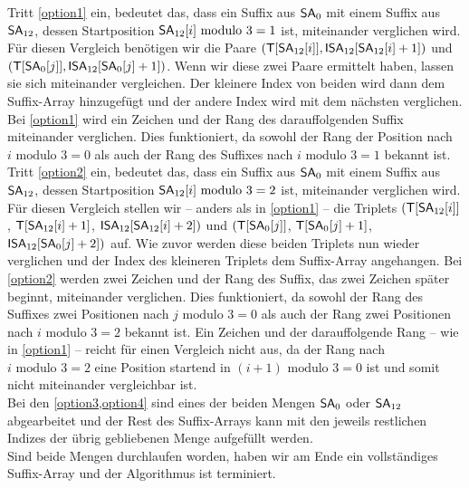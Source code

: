 Tritt \cref{option1} ein, bedeutet das, dass ein Suffix aus $\sa_{0}$ mit einem Suffix aus $\sa_{12}$, dessen Startposition $\sa_{12}[i] \text{ modulo } 3 = 1$ ist, miteinander verglichen wird. Für diesen Vergleich benötigen wir die Paare $(\inputtext[\sa_{12}[i]], \isa_{12}[\sa_{12}[i]+1])$ und $(\inputtext[\sa_{0}[j]], \isa_{12}[\sa_{0}[j]+1])$. Wenn wir diese zwei Paare ermittelt haben, lassen sie sich miteinander vergleichen. Der kleinere Index von beiden wird dann dem Suffix-Array \sa hinzugefügt und der andere Index wird mit dem nächsten verglichen. Bei \cref{option1} wird ein Zeichen und der Rang des darauffolgenden Suffix miteinander verglichen. Dies funktioniert, da sowohl der Rang der Position nach $i \text{ modulo } 3 = 0$ als auch der Rang des Suffixes nach $i \text{ modulo } 3 = 1$ bekannt ist. \\
Tritt \cref{option2} ein, bedeutet das, dass ein Suffix aus $\sa_{0}$ mit einem Suffix aus $\sa_{12}$, dessen Startposition $\sa_{12}[i] \text{ modulo } 3 = 2$ ist, miteinander verglichen wird. Für diesen Vergleich stellen wir -- anders als in \cref{option1} -- die Triplets $(\inputtext[\sa_{12}[i]]$, $\inputtext[\sa_{12}[i]+1]$, $\isa_{12}[\sa_{12}[i]+2])$ und $(\inputtext[\sa_{0}[j]]$, $\inputtext[\sa_{0}[j]+1]$, $\isa_{12}[\sa_{0}[j]+2])$ auf. Wie zuvor werden diese beiden Triplets nun wieder verglichen und der Index des kleineren Triplets dem Suffix-Array angehangen. Bei \cref{option2} werden zwei Zeichen und der Rang des Suffix, das zwei Zeichen später beginnt, miteinander verglichen. Dies funktioniert, da sowohl der Rang des Suffixes zwei Positionen nach $j \text{ modulo } 3 = 0$ als auch der Rang zwei Positionen nach $i \text{ modulo } 3 = 2$ bekannt ist. Ein Zeichen und der darauffolgende Rang -- wie in \cref{option1} -- reicht für einen Vergleich nicht aus, da der Rang nach $i \text{ modulo } 3 = 2$ eine Position startend in $(i+1) \text{ modulo } 3 = 0$ ist und somit nicht miteinander vergleichbar ist.\\
Bei den \cref{option3,option4} sind eines der beiden Mengen $\sa_{0}$ oder $\sa_{12}$ abgearbeitet und der Rest des Suffix-Arrays kann mit den jeweils restlichen Indizes der übrig gebliebenen Menge aufgefüllt werden.\\
Sind beide Mengen durchlaufen worden, haben wir am Ende ein vollständiges Suffix-Array und der Algorithmus ist terminiert.

